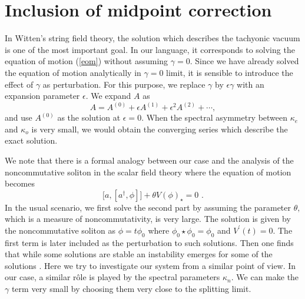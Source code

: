 \documentclass[a4paper,aps,preprint,nofootinbib,eqsecnum]{revtex4}
\begin{document}
\section{Inclusion of midpoint correction}

\label{perturbation} In Witten's string field theory, the solution which
describes the tachyonic vacuum is one of the most important goal. In our
language, it corresponds to solving the equation of motion (\ref{eom})
without assuming $\gamma =0$. Since we have already solved the equation of
motion analytically in $\gamma =0$ limit, it is sensible to introduce the
effect of $\gamma $ as perturbation. For this purpose, we replace $\gamma $
by $\epsilon \gamma $ with an expansion parameter $\epsilon $. We expand $A$
as
\begin{equation}
A=A^{\left( 0\right) }+\epsilon A^{\left( 1\right) }+\epsilon ^{2}A^{\left(
2\right) }+\cdots ,  \label{expansion}
\end{equation}%
and use $A^{\left( 0\right) }$ as the solution at $\epsilon =0$. When the
spectral asymmetry between $\kappa _{e}$ and $\kappa _{o}$ is very small, we
would obtain the converging series which describe the exact solution.

We note that there is a formal analogy between our case and the analysis of
the noncommutative soliton in the scalar field theory where the equation of
motion becomes
\begin{equation}
\lbrack a,[a^{\dagger },\phi ]]+\theta V(\phi )_{\star }=0\,\,.
\end{equation}%
In the usual scenario, we first solve the second part by assuming the
parameter $\theta ,$ which is a measure of noncommutativity, is very large.
The solution is given by the noncommutative soliton as $\phi =t\phi _{0}$
where $\phi _{0}\star \phi _{0}=\phi _{0}$ and $V^{\prime }(t)=0$. The first
term is later included as the perturbation to such solutions. Then one finds
that while some solutions are stable an instability emerges for some of the
solutions \cite{soliton-stability}. Here we try to investigate our system
from a similar point of view. In our case, a similar r\^{o}le is played by
the spectral parameters $\kappa _{n}$. We can make the $\gamma $ term very
small by choosing them very close to the splitting limit.
\end{document}
